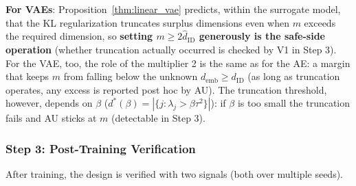 \documentclass[make,article,submit,pdftex,moreauthors]{Definitions/mdpi}
\newcommand{\dID}{d_{\mathrm{ID}}}
\newcommand{\hatdID}{\hat{d}_{\mathrm{ID}}}
\newcommand{\demb}{d_{\mathrm{emb}}}
\newcommand{\dstar}{d^{*}(\beta)}
\begin{document}
\textbf{For VAEs}: Proposition~\ref{thm:linear_vae} predicts, within the
surrogate model, that the KL regularization truncates surplus dimensions
even when $m$ exceeds the required dimension, so
\textbf{setting $m \geq 2\hatdID$ generously is the safe-side operation}
(whether truncation actually occurred is checked by V1 in Step 3).
For the VAE, too, the role of the multiplier 2 is the same as for the AE: a
margin that keeps $m$ from falling below the unknown $\demb \geq \dID$ (as
long as truncation operates, any excess is reported post hoc by AU).
The truncation threshold, however, depends on $\beta$
($\dstar = |\{j : \lambda_j > \beta\tau^2\}|$): if $\beta$ is too small the
truncation fails and AU sticks at $m$ (detectable in Step 3).

\subsubsection{Step 3: Post-Training Verification}\label{sec:protocol_s3}

After training, the design is verified with two signals (both over multiple
seeds).
\end{document}
